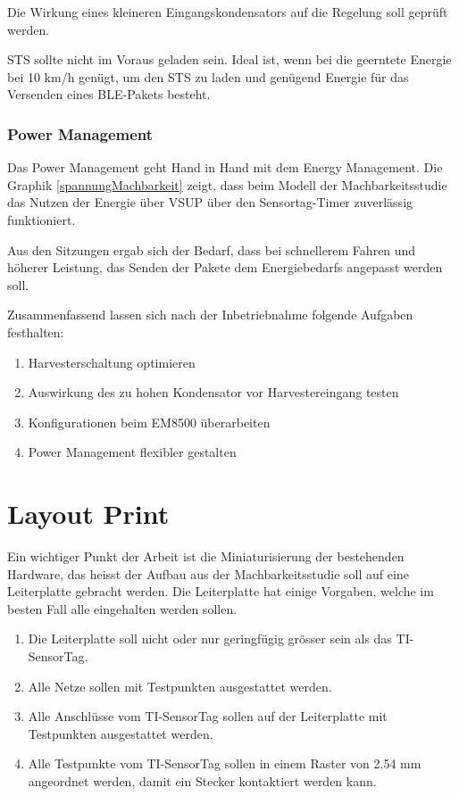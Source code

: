 Die Wirkung eines kleineren Eingangskondensators auf die Regelung soll geprüft werden.

STS sollte nicht im Voraus geladen sein. Ideal ist, wenn bei die geerntete Energie bei 10 km/h genügt, um den STS zu laden und genügend Energie für das Versenden eines BLE-Pakets besteht.



\subsubsection{Power Management}

Das Power Management geht Hand in Hand mit dem Energy Management. Die Graphik \ref{spannungMachbarkeit} zeigt, dass beim Modell der Machbarkeitsstudie das Nutzen der Energie über VSUP über den Sensortag-Timer zuverlässig funktioniert.

Aus den Sitzungen ergab sich der Bedarf, dass bei schnellerem Fahren und höherer Leistung, das Senden der Pakete dem Energiebedarfs angepasst werden soll.


Zusammenfassend lassen sich nach der Inbetriebnahme folgende Aufgaben festhalten:


\begin{enumerate}
    \item Harvesterschaltung optimieren
    \item Auswirkung des zu hohen Kondensator vor Harvestereingang testen
    \item Konfigurationen beim EM8500 überarbeiten
    \item Power Management flexibler gestalten
\end{enumerate}


\section{Layout Print}

Ein wichtiger Punkt der Arbeit ist die Miniaturisierung der bestehenden Hardware, das heisst der Aufbau aus der Machbarkeitsstudie soll auf eine Leiterplatte gebracht werden. Die Leiterplatte hat einige Vorgaben, welche im besten Fall alle eingehalten werden sollen.

\begin{enumerate}
    \item Die Leiterplatte soll nicht oder nur geringfügig grösser sein als das TI-SensorTag.
    
    \item Alle Netze sollen mit Testpunkten ausgestattet werden.
    
    \item Alle Anschlüsse vom TI-SensorTag sollen auf der Leiterplatte mit Testpunkten ausgestattet werden.
    
    \item Alle Testpunkte vom TI-SensorTag sollen in einem Raster von 2.54 mm angeordnet werden, damit ein Stecker kontaktiert werden kann.
    
\end{enumerate}
	


